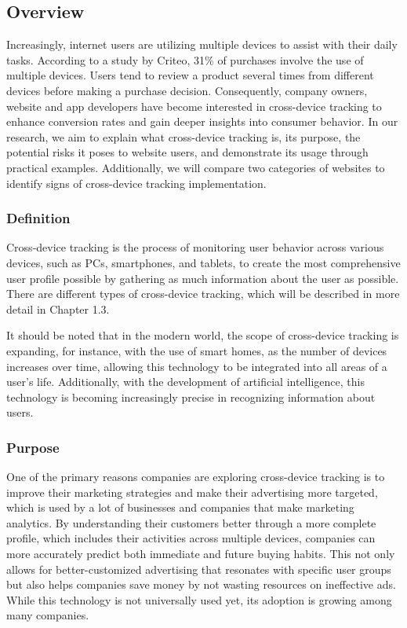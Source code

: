 \subsection{Overview}
Increasingly, internet users are utilizing multiple devices to assist with their daily tasks. According to a study by Criteo\cite{Criteo}, 31\% of purchases involve the use of multiple devices. Users tend to review a product several times from different devices before making a purchase decision. Consequently, company owners, website and app developers have become interested in cross-device tracking to enhance conversion rates and gain deeper insights into consumer behavior. In our research, we aim to explain what cross-device tracking is, its purpose, the potential risks it poses to website users, and demonstrate its usage through practical examples. Additionally, we will compare two categories of websites to identify signs of cross-device tracking implementation.

\subsubsection{Definition}
Cross-device tracking is the process of monitoring user behavior across various devices, such as PCs, smartphones, and tablets, to create the most comprehensive user profile possible by gathering as much information about the user as possible. There are different types of cross-device tracking, which will be described in more detail in Chapter 1.3.

It should be noted that in the modern world, the scope of cross-device tracking is expanding, for instance, with the use of smart homes, as the number of devices increases over time, allowing this technology to be integrated into all areas of a user's life. Additionally, with the development of artificial intelligence, this technology is becoming increasingly precise in recognizing information about users.

\subsubsection{Purpose}
One of the primary reasons companies are exploring cross-device tracking is to improve their marketing strategies and make their advertising more targeted, which is used by a lot of businesses and companies that make marketing analytics.\cite{wizalyArticle} By understanding their customers better through a more complete profile, which includes their activities across multiple devices, companies can more accurately predict both immediate and future buying habits. This not only allows for better-customized advertising that resonates with specific user groups but also helps companies save money by not wasting resources on ineffective ads. While this technology is not universally used yet, its adoption is growing among many companies\cite{CrossDeviceComments}.

